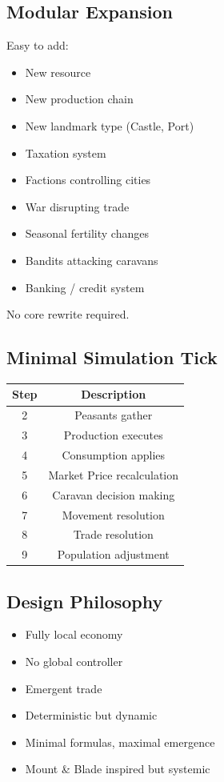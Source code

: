 \subsection{Modular Expansion}

Easy to add:

\begin{itemize}
\item New resource
\item New production chain
\item New landmark type (Castle, Port)
\item Taxation system
\item Factions controlling cities
\item War disrupting trade
\item Seasonal fertility changes
\item Bandits attacking caravans
\item Banking / credit system
\end{itemize}

No core rewrite required.



\subsection{Minimal Simulation Tick}

\begin{table}[H]
\centering
\begin{tabular}{|c|c|}
\hline
Step & Description \\
\hline
2 & Peasants gather \\
3 & Production executes \\
4 & Consumption applies \\
5 & Market Price recalculation \\
6 & Caravan decision making \\
7 & Movement resolution \\
8 & Trade resolution \\
9 & Population adjustment \\
\hline
\end{tabular}
\end{table}



\subsection{Design Philosophy}

\begin{itemize}
\item Fully local economy
\item No global controller
\item Emergent trade
\item Deterministic but dynamic
\item Minimal formulas, maximal emergence
\item Mount \& Blade inspired but systemic
\end{itemize}